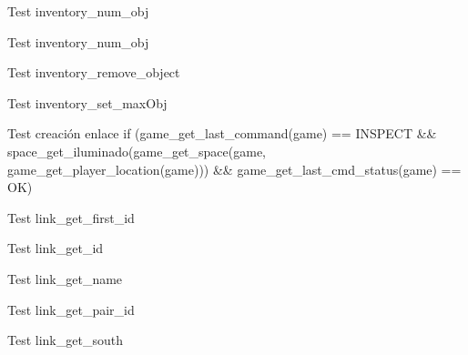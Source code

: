 \begin{DoxyRefList}
%
Test inventory\+\_\+num\+\_\+obj  
\item[Global \mbox{\hyperlink{inventory__test_8c_ab1b4de1d11107126c08bd945cc98b193}{test2\+\_\+inventory\+\_\+num\+\_\+obj}} ()]\label{test__test000060}%
%
Test inventory\+\_\+num\+\_\+obj  
\item[Global \mbox{\hyperlink{inventory__test_8c_a4ea1bbd9668f1049fb98590ffb0dd5db}{test2\+\_\+inventory\+\_\+remove\+\_\+object}} ()]\label{test__test000050}%
%
Test inventory\+\_\+remove\+\_\+object  
\item[Global \mbox{\hyperlink{inventory__test_8c_a1291b4ce37ec217e6b511fa34bb1510b}{test2\+\_\+inventory\+\_\+set\+\_\+max\+Obj}} ()]\label{test__test000058}%
%
Test inventory\+\_\+set\+\_\+max\+Obj  
\item[Global \mbox{\hyperlink{link__test_8c_a24b5463da176c3e578b0a0fa8bb1f9f0}{test2\+\_\+link\+\_\+create}} ()]\label{test__test000064}%
%
Test creación enlace if (game\+\_\+get\+\_\+last\+\_\+command(game) == I\+N\+S\+P\+E\+CT \&\& space\+\_\+get\+\_\+iluminado(game\+\_\+get\+\_\+space(game, game\+\_\+get\+\_\+player\+\_\+location(game))) \&\& game\+\_\+get\+\_\+last\+\_\+cmd\+\_\+status(game) == OK)  
\item[Global \mbox{\hyperlink{link__test_8c_af0c3fb62759aaf568bdc5cb72cb8f30b}{test2\+\_\+link\+\_\+get\+\_\+first\+\_\+id}} ()]\label{test__test000077}%
%
Test link\+\_\+get\+\_\+first\+\_\+id  
\item[Global \mbox{\hyperlink{link__test_8c_a0f967a1782dd7264e73ad428d22d125d}{test2\+\_\+link\+\_\+get\+\_\+id}} ()]\label{test__test000086}%
%
Test link\+\_\+get\+\_\+id  
\item[Global \mbox{\hyperlink{link__test_8c_a4efc6cfcdc210e2803f9d285734c571e}{test2\+\_\+link\+\_\+get\+\_\+name}} ()]\label{test__test000075}%
%
Test link\+\_\+get\+\_\+name  
\item[Global \mbox{\hyperlink{link__test_8c_a09a883ad9283fd40b9f68a9fda522d35}{test2\+\_\+link\+\_\+get\+\_\+pair\+\_\+id}} ()]\label{test__test000081}%
%
Test link\+\_\+get\+\_\+pair\+\_\+id  
\item[Global \mbox{\hyperlink{link__test_8c_a23d23094ed00e4cc58dcadb5d2d0cb52}{test2\+\_\+link\+\_\+get\+\_\+second\+\_\+id}} ()]\label{test__test000079}%
%
Test link\+\_\+get\+\_\+south  

\end{DoxyRefList}
